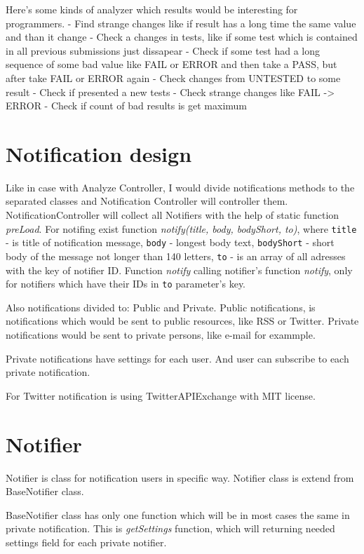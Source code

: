 Here's some kinds of analyzer which results would be interesting for programmers.
- Find strange changes like if result has a long time the same value and than it change
- Check a changes in tests, like if some test which is contained in all previous submissions just dissapear
- Check if some test had a long sequence of some bad value like FAIL or ERROR and then take a PASS, but after take FAIL or ERROR again
- Check changes from UNTESTED to some result
- Check if presented a new tests
- Check strange changes like FAIL -> ERROR
- Check if count of bad results is get maximum

\chapter{Notification design}

Like in case with Analyze Controller, I would divide notifications methods to the separated classes and Notification Controller will controller them. NotificationController will collect all Notifiers with the help of static function \emph{preLoad}. For notifing exist function \emph{notify(title, body, bodyShort, to)}, where \texttt{title} - is title of notification message, \texttt{body} - longest body text, \texttt{bodyShort} - short body of the message not longer than 140 letters, \texttt{to} - is an array of all adresses with the key of notifier ID. Function \emph{notify} calling notifier's function \emph{notify}, only for notifiers which have their IDs in \texttt{to} parameter's key.

Also notifications divided to: Public and Private. Public notifications, is notifications which would be sent to public resources, like RSS or Twitter. Private notifications would be sent to private persons, like e-mail for exammple.

Private notifications have settings for each user. And user can subscribe to each private notification.

For Twitter notification is using TwitterAPIExchange with MIT license.

\chapter{Notifier}

Notifier is class for notification users in specific way. Notifier class is extend from BaseNotifier class.

BaseNotifier class has only one function which will be in most cases the same in private notification. This is \emph{getSettings} function, which will returning needed settings field for each private notifier. 

